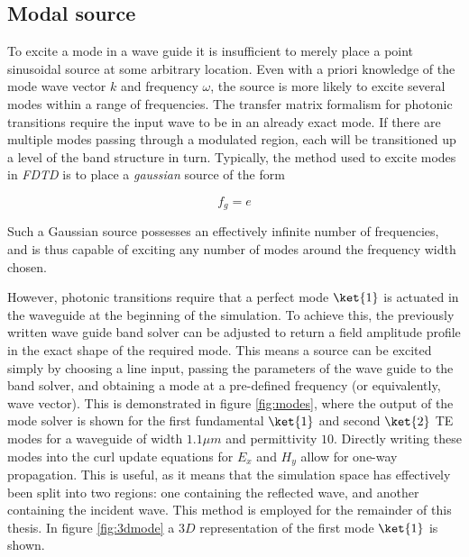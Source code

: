 \subsection{Modal source}
To excite a mode in a wave guide it is insufficient to merely place a point sinusoidal source at some arbitrary location. Even with a priori knowledge of the mode wave vector $k$ and frequency $\omega$, the source is more likely to excite several modes within a range of frequencies. The transfer matrix formalism for photonic transitions require the input wave to be in an already exact mode. If there are multiple modes passing through a modulated region, each will be transitioned up a level of the band structure in turn.
Typically, the method used to excite modes in \textit{FDTD} is to place a \textit{gaussian} source of the form

\begin{equation}
f_{g} = e
\end{equation}

Such a Gaussian source possesses an effectively infinite number of frequencies, and is thus capable of exciting any number of modes around the frequency width chosen. 

However, photonic transitions require that a perfect mode $\ket{1}$ is actuated in the waveguide at the beginning of the simulation. To achieve this, the previously written wave guide band solver can be adjusted to return a field amplitude profile in the exact shape of the required mode. This means a source can be excited simply by choosing a line input, passing the parameters of the wave guide to the band solver, and obtaining a mode at a pre-defined frequency (or equivalently, wave vector). This is demonstrated in figure \ref{fig:modes}, where the output of the mode solver is shown for the first fundamental $\ket{1}$ and second $\ket{2}$ TE modes for a waveguide of width $1.1 \mu m$ and permittivity $10$. Directly writing these modes into the curl update equations for $E_x$ and $H_y$ allow for one-way propagation. This is useful, as it means that the simulation space has effectively been split into two regions: one containing the reflected wave, and another containing the incident wave. This method is employed for the remainder of this thesis. In figure \ref{fig:3dmode} a $3D$ representation of the first mode $\ket{1}$ is shown. 

